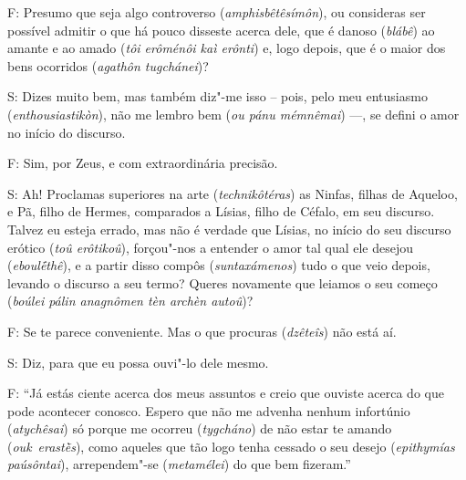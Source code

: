 F: Presumo que seja algo controverso (\emph{amphisbêtêsímôn}), ou
consideras ser possível admitir o que há pouco disseste acerca dele, que
é danoso (\emph{blábê}) ao amante e ao amado (\emph{tôi erôménôi kaì
erônti}) e, logo depois, que é o maior dos bens ocorridos (\emph{agathôn
tugchánei})?

 

\bekker{[263d]} S: Dizes muito bem, mas também diz"-me isso -- pois, pelo meu
entusiasmo (\emph{enthousiastikòn}), não me lembro bem (\emph{ou pánu
mémnêmai}) \mbox{---,} se defini o amor no início do discurso.

 

F: Sim, por Zeus, e com extraordinária precisão.

 

S: Ah! Proclamas superiores na arte (\emph{technikôtéras}) as Ninfas,
filhas de Aqueloo, e Pã, filho de Hermes, comparados a Lísias, filho de
Céfalo, em seu discurso. Talvez eu esteja errado, mas não é verdade que
Lísias, no início do seu discurso erótico (\emph{toû erôtikoû}),
forçou"-nos a entender o amor tal qual ele desejou (\emph{eboulḗthê}), e
a partir disso compôs (\emph{suntaxámenos}) tudo o que veio depois,
levando o discurso a seu termo? \bekker{[263e]} Queres novamente que leiamos
o seu começo (\emph{boúlei pálin anagnômen tèn archèn autoû})?

 

F: Se te parece conveniente. Mas o que procuras (\emph{dzêteîs}) não
está aí.

 

S: Diz, para que eu possa ouvi"-lo dele mesmo.

 

F: ``Já estás ciente acerca dos meus assuntos e creio que ouviste acerca
do que pode acontecer conosco. Espero que não me advenha nenhum
infortúnio (\emph{atychêsai}) só porque me ocorreu (\emph{tygcháno}) de
não estar te amando (\emph{ouk}~\emph{erastḕs}), \bekker{[264a]}como aqueles
que tão logo tenha cessado o seu desejo (\emph{epithymías paúsôntai}),
arrependem"-se (\emph{metamélei}) do que bem fizeram.''

